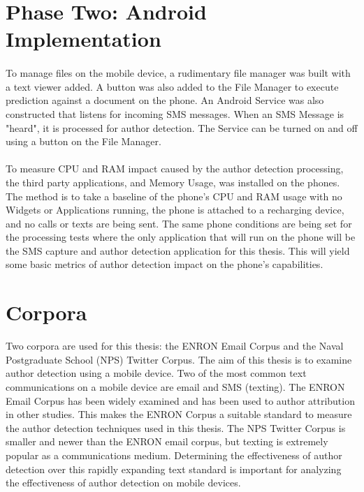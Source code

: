
\section{Phase Two: Android Implementation}
	\paragraph{}To manage files on the mobile device, a rudimentary file manager was built with a text viewer added.  A button was also added to the File Manager to execute prediction against a document on the phone.  An Android Service was also constructed that listens for incoming SMS messages.  When an SMS Message is "heard", it is processed for author detection.  The Service can be turned on and off using a button on the File Manager.  
	\paragraph{}To measure CPU and RAM impact caused by the author detection processing, the third party applications, and Memory Usage, was installed on the phones.  The method is to take a baseline of the phone's CPU and RAM usage with no Widgets or Applications running, the phone is attached to a recharging device, and no calls or texts are being sent.  The same phone conditions are being set for the processing tests where the only application that will run on the phone will be the SMS capture and author detection application for this thesis.  This will yield some basic metrics of author detection impact on the phone's capabilities.

\section{Corpora} Two corpora are used for this thesis: the ENRON Email Corpus and the Naval Postgraduate School (NPS) Twitter Corpus.  The aim of this thesis is to examine author detection using a mobile device.  Two of the most common text communications on a mobile device are email and SMS (texting).  The ENRON Email Corpus has been widely examined and has been used to author attribution in other studies.  This makes the ENRON Corpus a suitable standard to measure the author detection techniques used in this thesis.  The NPS Twitter Corpus is smaller and newer than the ENRON email corpus, but texting is extremely popular as a communications medium.  Determining the effectiveness of author detection over this rapidly expanding text standard is important for analyzing the effectiveness of author detection on mobile devices.
